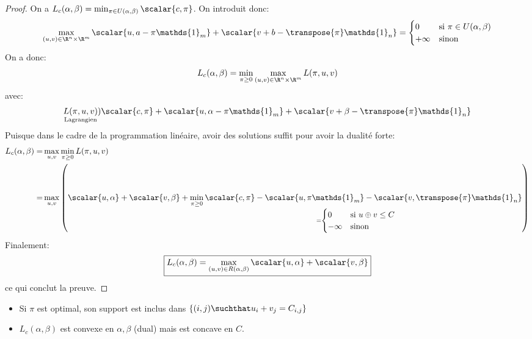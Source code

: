 \begin{proof}
	On a $L_{c}(\alpha, \beta) = \min_{\pi \in U(\alpha, \beta)} \scalar{c, \pi}$.
	On introduit donc:
	\begin{equation*}
		\max_{(u, v) \in \R^{n} \times \R^{m}} \scalar{u, a - \pi\mathds{1}_{m}} + \scalar{v + b-\transpose{\pi}\mathds{1}_{n}} =
		\begin{cases}
			0        & \text{si } \pi \in U(\alpha, \beta) \\
			+ \infty & \text{sinon}
		\end{cases}
	\end{equation*}
	On a donc:
	\begin{equation*}
		L_{c}(\alpha, \beta) = \min_{\pi \geq 0}\max_{(u, v) \in \R^{n} \times \R^{m}} L(\pi, u, v)
	\end{equation*}
	avec:
	\begin{equation*}
		\underset{\rm Lagrangien}{L(\pi, u, v)} ) \scalar{c, \pi} + \scalar{u, \alpha - \pi\mathds{1}_{m}} + \scalar{v + \beta-\transpose{\pi}\mathds{1}_{n}}
	\end{equation*}
	Puisque dans le cadre de la programmation linéaire, avoir des solutions suffit pour avoir la dualité forte:
	\begin{align*}
		L_{c}(\alpha, \beta) = & \max_{u, v} \min_{\pi\geq 0}L(\pi, u, v)                               \\
		=                      & \max_{u, v} \left(\scalar{u, \alpha} + \scalar{v, \beta} + \underset{=
			\begin{cases}
				0       & \text{si } u \oplus v \leq C \\
				-\infty & \text{sinon }
			\end{cases}%
		}{\min_{\pi \geq 0} \scalar{c, \pi} - \scalar{u, \pi\mathds{1}_{m}} - \scalar{v, \transpose{\pi}\mathds{1}_{n}}}\right)
	\end{align*}
	Finalement:
	\begin{equation*}
		\boxed{L_{c}(\alpha, \beta) = \max_{(u, v) \in R(\alpha, \beta)} \scalar{u, \alpha} + \scalar{v, \beta}}
	\end{equation*}
	ce qui conclut la preuve.
\end{proof}

\begin{remarque}
	\begin{itemize}
		\item Si $\pi$ est optimal, son support est inclus dans $\left\{(i, j)\suchthat u_{i} + v_{j} = C_{i, j}\right\}$
		\item $L_{c}(\alpha, \beta)$ est convexe en $\alpha, \beta$ (dual) mais est concave en $C$.
	\end{itemize}
\end{remarque}

